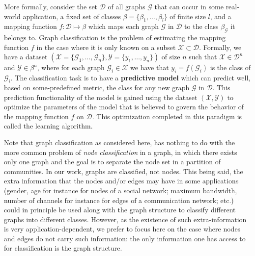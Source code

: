 More formally, consider the set $\mathcal{D}$ of all graphs $\mathcal{G}$ that can occur in some real-world application, a fixed set of classes $\beta=\{\beta _1,\ldots,\beta _l\}$ of finite size $l$, and a mapping function $f:\mathcal{D}\mapsto\beta$ which maps each graph $\mathcal{G}$ in $\mathcal{D}$ to the class $\beta_\mathcal{G}$ it belongs to. Graph classification is the problem of estimating the mapping function $f$ in the case where it is only known on a subset $\mathcal{X}\subset \mathcal{D}$. Formally, we have a dataset $(\mathcal{X}=\{\mathcal{G}_1,\ldots,\mathcal{G}_n\}, \mathcal{Y}=\{y_1,\ldots,y_n\})$ of size $n$ such that $\mathcal{X}\in \mathcal{D}^n$ and $\mathcal{Y}\in\beta^n$, where for each graph $\mathcal{G}_i\in \mathcal{X}$ we have that $y_i=f(\mathcal{G}_i)$ is the class of $\mathcal{G}_i$. The classification task is to have a \textbf{predictive model} which can predict well, based on some-predefined metric,  the class for any new graph $\mathcal{G}$ in $\mathcal{D}$. This prediction functionality of the model is gained using the dataset $(\mathcal{X}, \mathcal{Y})$ to optimize the parameters of the model that is believed to govern the behavior of the mapping function $f$ on $\mathcal{D}$. This optimization completed in this paradigm is called the learning algorithm.

Note that graph classification as considered here, has nothing to do with the more common problem of \emph{node classification} in a graph, in which there exists only one graph and the goal is to separate the node set in a partition of communities. In our work, graphs are classified, not nodes. This being said, the extra information that the nodes and/or edges may have in some applications (gender, age for instance for nodes of a social network; maximum bandwidth, number of channels for instance for edges of a communication network; etc.) could in principle be used along with the graph structure to classify different graphs into different classes. However, as the existence of such extra-information is very application-dependent, we prefer to focus here on the case where nodes and edges do not carry such information: the only information one has access to for classification is the graph structure.

